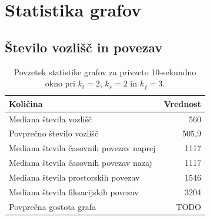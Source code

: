 
\section{Statistika grafov}
\label{subsec:statistika-grafov}


\subsection{Število vozlišč in povezav}

\begin{table}[H]
    \centering
    \caption{Povzetek statistike grafov za privzeto 10-sekundno okno pri $k_t=2$, $k_s=2$ in $k_f=3$.}
    \label{tab:graph-statistics}
    \begin{tabular}{lr}
        \toprule
        Količina & Vrednost \\
        \midrule
        Mediana števila vozlišč & 560 \\
        Povprečno število vozlišč & 505,9 \\
        Mediana števila časovnih povezav naprej & 1117 \\
        Mediana števila časovnih povezav nazaj & 1117 \\
        Mediana števila prostorskih povezav & 1546 \\
        Mediana števila fiksacijskih povezav & 3204 \\
        Povprečna gostota grafa & TODO \\
        \bottomrule
    \end{tabular}
\end{table}

